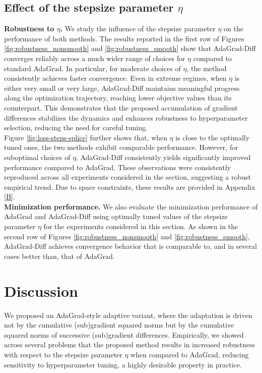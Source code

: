 \documentclass[11pt]{article}
\theoremstyle{plain}
\theoremstyle{definition}
\theoremstyle{remark}
\begin{document}
\subsection{Effect of the stepsize parameter $\eta$}
\textbf{Robustness to $\eta$.}
We study the influence of the stepsize parameter $\eta$ on the performance of both methods. The results reported in the first row of Figures \ref{fig:robustness_nonsmooth} and \ref{fig:robustness_smooth} show that AdaGrad-Diff converges reliably across a much wider range of choices for $\eta$ compared to standard AdaGrad. In particular, for moderate choices of $\eta$, the method consistently achieves faster convergence. Even in extreme regimes, when $\eta$ is either very small or very large, AdaGrad-Diff maintains meaningful progress along the optimization trajectory, reaching lower objective values than its counterpart. This demonstrates that the proposed accumulation of gradient differences stabilizes the dynamics and enhances robustness to hyperparameter selection, reducing the need for careful tuning.\\

\noindent
Figure \ref{fig:loss-steps-splice} further shows that, when $\eta$ is close to the optimally tuned ones, the two methods exhibit comparable performance. However, for suboptimal choices of $\eta$, AdaGrad-Diff consistently yields significantly improved performance compared to AdaGrad. These observations were consistently reproduced across all experiments considered in the section, suggesting a robust empirical trend. Due to space constraints, these results are provided in Appendix \ref{B}.\\

\noindent
\textbf{Minimization performance.}
We also evaluate the minimization performance of AdaGrad and AdaGrad-Diff using optimally tuned values of the stepsize parameter $\eta$ for the experiments considered in this section. As shown in the second row of Figures \ref{fig:robustness_nonsmooth} and \ref{fig:robustness_smooth}, AdaGrad-Diff achieves convergence behavior that is comparable to, and in several cases better than, that of AdaGrad.

\section{Discussion}
We proposed an AdaGrad-style adaptive variant, where the adaptation is driven not by the cumulative (sub)gradient squared norms but by the cumulative squared norms of successive (sub)gradient differences. 
Empirically, we showed across several problems that the proposed method results in increased robustness with respect to the stepsize parameter $\eta$ when compared to AdaGrad, reducing sensitivity to hyperparameter tuning, a highly desirable property in practice. 
\end{document}
